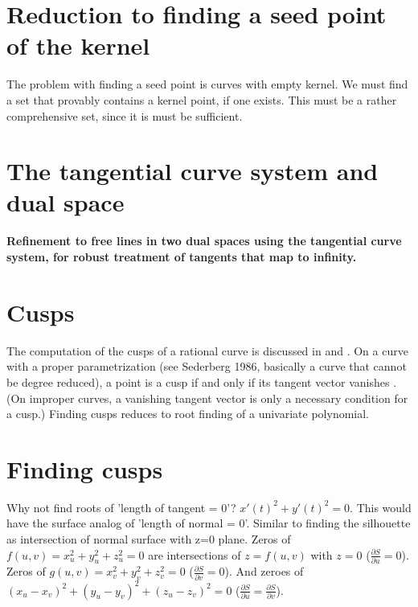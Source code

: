 \documentclass[12pt]{article}
\begin{document}
\section{Reduction to finding a seed point of the kernel}

The problem with finding a seed point is curves with empty kernel.
We must find a set that provably contains a kernel point, if one exists.
This must be a rather comprehensive set, since it is must be sufficient.

\section{The tangential curve system and dual space}

{\bf Refinement to free lines in two dual spaces using the tangential curve system,
for robust treatment of tangents that map to infinity.}

\section{Cusps}

The computation of the cusps of a rational curve is discussed in
\cite{manocha92} and \cite{li97}.
On a curve with a proper parametrization (see Sederberg 1986, basically
a curve that cannot be degree reduced),
a point is a cusp if and only if its tangent vector vanishes \cite{manocha92}. %
(On improper curves, a vanishing tangent vector is only a necessary
condition for a cusp.)
Finding cusps reduces to root finding of a univariate polynomial.


\section{Finding cusps}

Why not find roots of 'length of tangent = 0'?
$x'(t)^2 + y'(t)^2 = 0$.
This would have the surface analog of 'length of normal = 0'.
Similar to finding the silhouette as intersection of normal surface
with z=0 plane.
Zeros of $f(u,v) = x_u^2 + y_u^2 + z_u^2 = 0$ are intersections of
$z = f(u,v)$ with $z=0$ ($\frac{\partial S}{\partial u} = 0$).
Zeros of $g(u,v) = x_v^2 + y_v^2 + z_v^2 = 0$ 
($\frac{\partial S}{\partial v} = 0$).
And zeroes of $(x_u - x_v)^2 + (y_u - y_v)^2 + (z_u - z_v)^2 = 0$
($\frac{\partial S}{\partial u} = \frac{\partial S}{\partial v}$).
\end{document}
